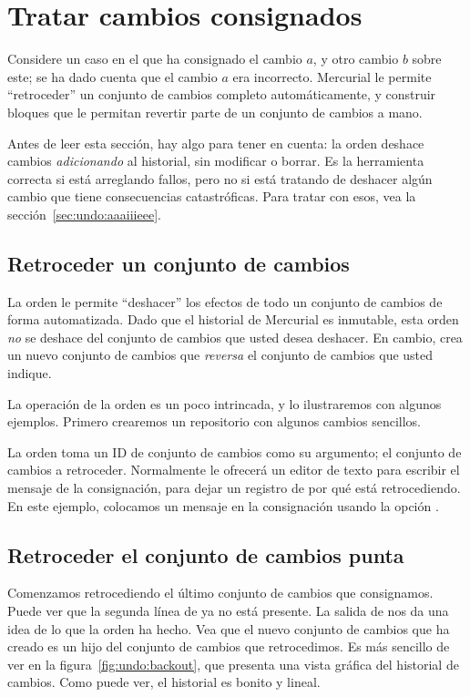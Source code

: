 \section{Tratar cambios consignados}

Considere un caso en el que ha consignado el cambio $a$, y otro cambio
$b$ sobre este; se ha dado cuenta que el cambio $a$ era
incorrecto. Mercurial le permite ``retroceder'' un conjunto de cambios
completo automáticamente, y construir bloques que le permitan revertir
parte de un conjunto de cambios a mano.

Antes de leer esta sección, hay algo para tener en cuenta: la orden
 deshace cambios \emph{adicionando} al historial, sin
modificar o borrar.  Es la herramienta correcta si está arreglando
fallos, pero no si está tratando de deshacer algún cambio que tiene
consecuencias catastróficas.  Para tratar con esos, vea la sección~\ref{sec:undo:aaaiiieee}.

\subsection{Retroceder un conjunto de cambios}

La orden  le permite ``deshacer'' los efectos de todo
un conjunto de cambios de forma automatizada.  Dado que el historial de
Mercurial es inmutable, esta orden \emph{no} se deshace del conjunto
de cambios que usted desea deshacer.  En cambio, crea un nuevo
conjunto de cambios que \emph{reversa} el conjunto de cambios que
usted indique.

La operación de la orden  es un poco intrincada, y lo
ilustraremos con algunos ejemplos. Primero crearemos un repositorio
con algunos cambios sencillos.

La orden  toma un ID de conjunto de cambios como su
argumento; el conjunto de cambios a retroceder. Normalmente
 le ofrecerá un editor de texto para escribir el
mensaje de la consignación, para dejar un registro de por qué está
retrocediendo. En este ejemplo, colocamos un mensaje en la
consignación usando la opción  .

\subsection{Retroceder el conjunto de cambios punta}

Comenzamos retrocediendo el último conjunto de cambios que consignamos.
Puede ver que la segunda línea de  ya no está
presente.  La salida de  nos da una idea de lo que la orden
 ha hecho.
Vea que el nuevo conjunto de cambios que  ha creado es
un hijo del conjunto de cambios que retrocedimos. Es más sencillo de
ver en la figura~\ref{fig:undo:backout}, que presenta una vista
gráfica del historial de cambios.  Como puede ver, el historial es
bonito y lineal.

